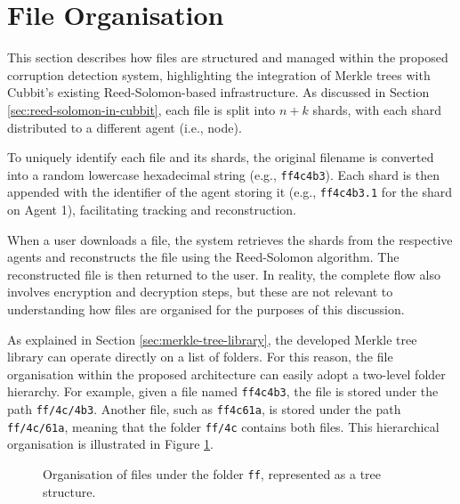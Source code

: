 \section{File Organisation}

This section describes how files are structured and managed within the proposed corruption detection system, highlighting the integration of Merkle trees with Cubbit's existing Reed-Solomon-based infrastructure. As discussed in Section \ref{sec:reed-solomon-in-cubbit}, each file is split into $n+k$ shards, with each shard distributed to a different agent (i.e., node).

To uniquely identify each file and its shards, the original filename is converted into a random lowercase hexadecimal string (e.g., \texttt{ff4c4b3}). Each shard is then appended with the identifier of the agent storing it (e.g., \texttt{ff4c4b3.1} for the shard on Agent 1), facilitating tracking and reconstruction.

When a user downloads a file, the system retrieves the shards from the respective agents and reconstructs the file using the Reed-Solomon algorithm. The reconstructed file is then returned to the user. In reality, the complete flow also involves encryption and decryption steps, but these are not relevant to understanding how files are organised for the purposes of this discussion.

As explained in Section \ref{sec:merkle-tree-library}, the developed Merkle tree library can operate directly on a list of folders. For this reason, the file organisation within the proposed architecture can easily adopt a two-level folder hierarchy. For example, given a file named \texttt{ff4c4b3}, the file is stored under the path \texttt{ff/4c/4b3}. Another file, such as \texttt{ff4c61a}, is stored under the path \texttt{ff/4c/61a}, meaning that the folder \texttt{ff/4c} contains both files. This hierarchical organisation is illustrated in Figure \ref{fig:file-organisation-example-in-tree}.  

\begin{figure}[h]
\centering
{}
\caption{Organisation of files under the folder \texttt{ff}, represented as a tree structure.}
\label{fig:file-organisation-example-in-tree}
\end{figure}

